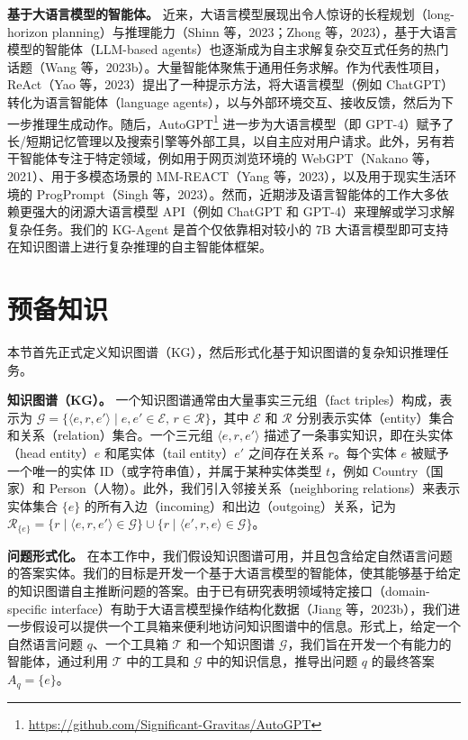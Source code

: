 \documentclass[11pt,UTF8,fontset=fandol]{ctexart}
\begin{document}
\textbf{基于大语言模型的智能体。}
近来，大语言模型展现出令人惊讶的长程规划（long-horizon planning）与推理能力（Shinn 等，2023；Zhong 等，2023），基于大语言模型的智能体（LLM-based agents）也逐渐成为自主求解复杂交互式任务的热门话题（Wang 等，2023b）。大量智能体聚焦于通用任务求解。作为代表性项目，ReAct（Yao 等，2023）提出了一种提示方法，将大语言模型（例如 ChatGPT）转化为语言智能体（language agents），以与外部环境交互、接收反馈，然后为下一步推理生成动作。随后，AutoGPT\footnote{\url{https://github.com/Significant-Gravitas/AutoGPT}} 进一步为大语言模型（即 GPT-4）赋予了长/短期记忆管理以及搜索引擎等外部工具，以自主应对用户请求。此外，另有若干智能体专注于特定领域，例如用于网页浏览环境的 WebGPT（Nakano 等，2021）、用于多模态场景的 MM-REACT（Yang 等，2023），以及用于现实生活环境的 ProgPrompt（Singh 等，2023）。然而，近期涉及语言智能体的工作大多依赖更强大的闭源大语言模型 API（例如 ChatGPT 和 GPT-4）来理解或学习求解复杂任务。我们的 KG-Agent 是首个仅依靠相对较小的 7B 大语言模型即可支持在知识图谱上进行复杂推理的自主智能体框架。

\section{预备知识}

本节首先正式定义知识图谱（KG），然后形式化基于知识图谱的复杂知识推理任务。

\textbf{知识图谱（KG）。}
一个知识图谱通常由大量事实三元组（fact triples）构成，表示为 $\mathcal{G} = \{\langle e, r, e' \rangle \mid e, e' \in \mathcal{E},\, r \in \mathcal{R}\}$，其中 $\mathcal{E}$ 和 $\mathcal{R}$ 分别表示实体（entity）集合和关系（relation）集合。一个三元组 $\langle e, r, e' \rangle$ 描述了一条事实知识，即在头实体（head entity）$e$ 和尾实体（tail entity）$e'$ 之间存在关系 $r$。每个实体 $e$ 被赋予一个唯一的实体 ID（或字符串值），并属于某种实体类型 $t$，例如 Country（国家）和 Person（人物）。此外，我们引入邻接关系（neighboring relations）来表示实体集合 $\{e\}$ 的所有入边（incoming）和出边（outgoing）关系，记为 $\mathcal{R}_{\{e\}} = \{r \mid \langle e, r, e' \rangle \in \mathcal{G}\} \cup \{r \mid \langle e', r, e \rangle \in \mathcal{G}\}$。

\textbf{问题形式化。}
在本工作中，我们假设知识图谱可用，并且包含给定自然语言问题的答案实体。我们的目标是开发一个基于大语言模型的智能体，使其能够基于给定的知识图谱自主推断问题的答案。由于已有研究表明领域特定接口（domain-specific interface）有助于大语言模型操作结构化数据（Jiang 等，2023b），我们进一步假设可以提供一个工具箱来便利地访问知识图谱中的信息。形式上，给定一个自然语言问题 $q$、一个工具箱 $\mathcal{T}$ 和一个知识图谱 $\mathcal{G}$，我们旨在开发一个有能力的智能体，通过利用 $\mathcal{T}$ 中的工具和 $\mathcal{G}$ 中的知识信息，推导出问题 $q$ 的最终答案 $A_q = \{e\}$。
\end{document}
